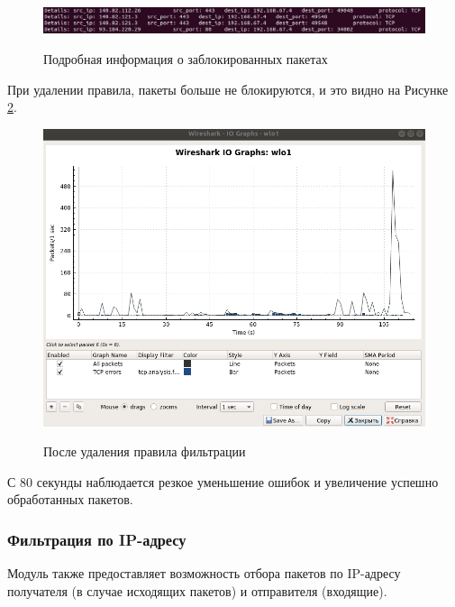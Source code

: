 \begin{figure}[h]
	\begin{center}
		{\includegraphics[scale = 0.6]{img/screenshots/rule_protocol/log_drop_packets.png}}
		\caption{Подробная информация о заблокированных пакетах}
		\label{fig17:image}
	\end{center}
\end{figure}

\newpage

При удалении правила, пакеты больше не блокируются, и это видно на Рисунке \ref{fig18:image}.
\begin{figure}[h!]
	\begin{center}
		{\includegraphics[scale = 0.5]{img/screenshots/rule_protocol/3_rule_protocol.png}}
		\caption{После удаления правила фильтрации}
		\label{fig18:image}
	\end{center}
\end{figure}

\newpage

С 80 секунды наблюдается резкое уменьшение ошибок и увеличение успешно обработанных пакетов. \newline

\subsubsection{Фильтрация по IP-адресу}
Модуль также предоставляет возможность отбора пакетов по IP-адресу получателя (в случае исходящих пакетов) и отправителя (входящие). 

